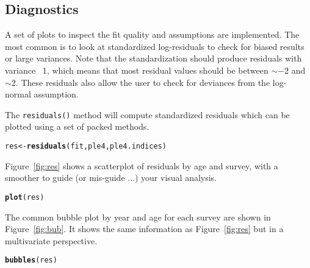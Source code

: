 \documentclass[a4paper,english,10pt]{article}\usepackage[]{graphicx}\usepackage[]{color}
\makeatletter
\newcommand{\hlstd}[1]{\textcolor[rgb]{0.345,0.345,0.345}{#1}}%
\newcommand{\hlkwb}[1]{\textcolor[rgb]{0.69,0.353,0.396}{#1}}%
\newcommand{\hlkwd}[1]{\textcolor[rgb]{0.737,0.353,0.396}{\textbf{#1}}}%
\newenvironment{kframe}{%
 \def\at@end@of@kframe{}%
 \ifinner\ifhmode%
  \def\at@end@of@kframe{\end{minipage}}%
  \begin{minipage}{\columnwidth}%
 \fi\fi%
 \def\FrameCommand##1{\hskip\@totalleftmargin \hskip-\fboxsep
 \colorbox{shadecolor}{##1}\hskip-\fboxsep
     \hskip-\linewidth \hskip-\@totalleftmargin \hskip\columnwidth}%
 \MakeFramed {\advance\hsize-\width
   \@totalleftmargin\z@ \linewidth\hsize
   \@setminipage}}%
 {\par\unskip\endMakeFramed%
 \at@end@of@kframe}
\newenvironment{knitrout}{}{} %
\newcommand{\code}[1]{{\texttt{#1}}}
\makeatother
\begin{document}
\subsection{Diagnostics}

A set of plots to inspect the fit quality and assumptions are implemented. The most common is to look at standardized log-residuals to check for biased results or large variances. Note that the standardization should produce residuals with variance ~1, which means that most residual values should be between $\sim -2$ and $\sim 2$. These residuals also allow the user to check for deviances from the log-normal assumption.

The \code{residuals()} method will compute standardized residuals which can be plotted using a set of packed methods.

\begin{knitrout}
\color{fgcolor}\begin{kframe}
\begin{alltt}
\hlstd{res} \hlkwb{<-} \hlkwd{residuals}\hlstd{(fit, ple4, ple4.indices)}
\end{alltt}


{\ttfamily\noindent\bfseries\color{errorcolor}{\#\# Error: object 'fit' not found}}\end{kframe}
\end{knitrout}

Figure~\ref{fig:res} shows a scatterplot of residuals by age and survey, with a smoother to guide (or mis-guide ...) your visual analysis.

\begin{knitrout}
\color{fgcolor}\begin{kframe}
\begin{alltt}
\hlkwd{plot}\hlstd{(res)}
\end{alltt}


{\ttfamily\noindent\bfseries\color{errorcolor}{\#\# Error: object 'res' not found}}\end{kframe}
\end{knitrout}

The common bubble plot by year and age for each survey are shown in Figure~\ref{fig:bub}. It shows the same information as Figure~\ref{fig:res} but in a multivariate perspective.

\begin{knitrout}
\color{fgcolor}\begin{kframe}
\begin{alltt}
\hlkwd{bubbles}\hlstd{(res)}
\end{alltt}


{\ttfamily\noindent\bfseries{}}\end{kframe}
\end{knitrout}
\end{document}
